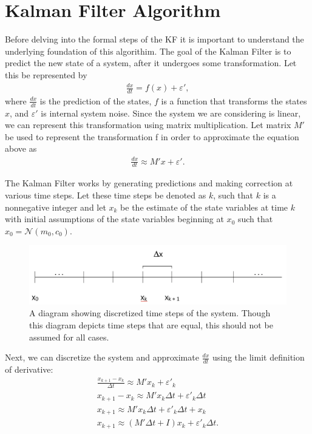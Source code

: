 \newpage

\section{Kalman Filter Algorithm}

Before  delving into the formal steps of the KF it is important to understand the underlying foundation of this algorithim. 
\noindent The goal of the Kalman Filter is to predict the new state of a system, after it undergoes some transformation. Let this be represented by 
\begin{align*}
	\frac{dx}{dt} = f(x) + \varepsilon ',
\end{align*}
where $\frac{dx}{dt}$ is the prediction of the states, $f$ is a function that transforms the states $x$, and $ \varepsilon '$ is internal system noise. Since the system we are considering is linear, we can represent this transformation using matrix multiplication. Let matrix $M'$ be used to represent the transformation f in order to approximate the equation above as
\begin{align*}
	\frac{dx}{dt} \approx M'x + \varepsilon '.
\end{align*}

\noindent The Kalman Filter works by generating predictions and making correction at various time steps. Let these time steps be denoted as $k$, such that $ k $ is a nonnegative integer and let $x_k$ be the estimate of the state variables at time $k$ with initial assumptions of the state variables beginning at $x_0$ such that $x_0 = \mathcal{N}(m_0, c_0) $. 

\begin{figure}[h]
    \centering
    \includegraphics[scale = 0.3]{kgraph.png}
    \caption{A diagram showing discretized time steps of the system. Though this diagram depicts time steps that are equal, this should not be assumed for all cases.}
\end{figure}

\noindent Next, we can discretize the system and approximate $\frac{dx}{dt}$ using the limit definition of derivative:
\begin{align*}
	\frac{x_{k+1} - x_k}{\Delta t} \approx M'x_k + \varepsilon '_k \\
	x_{k+1} - x_k \approx M'x_k \Delta t + \varepsilon '_k  \Delta t \\
	x_{k+1} \approx M'x_k \Delta t + \varepsilon '_k  \Delta t + x_k \\
	x_{k+1} \approx (M' \Delta t + I)x_k + \varepsilon '_k  \Delta t.
\end{align*}


